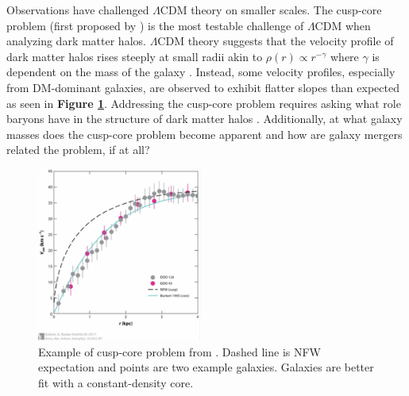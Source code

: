 Observations have challenged $\Lambda$CDM theory on smaller scales. The cusp-core problem (first proposed by \cite{Flores1994}) is the most testable challenge of $\Lambda$CDM when analyzing dark matter halos. $\Lambda$CDM theory suggests that the velocity profile of dark matter halos rises steeply at small radii akin to $\rho(r) \propto r^{-\gamma}$ where $\gamma$ is dependent on the mass of the galaxy \cite{Bullock2017}. Instead, some velocity profiles, especially from DM-dominant galaxies, are observed to exhibit flatter slopes than expected as seen in \textbf{Figure \ref{cusp-core}}. Addressing the cusp-core problem requires asking what role baryons have in the structure of dark matter halos \cite{Bullock2017}. Additionally, at what galaxy masses does the cusp-core problem become apparent and how are galaxy mergers related the problem, if at all?

\begin{figure}
   \centering
    \includegraphics[width=0.48\textwidth]{Figures/cusp-coreVprof.png}
  \caption{Example of cusp-core problem from \cite{Bullock2017}. Dashed line is NFW expectation and points are two example galaxies. Galaxies are better fit with a constant-density core.}
  \label{cusp-core}
\end{figure}